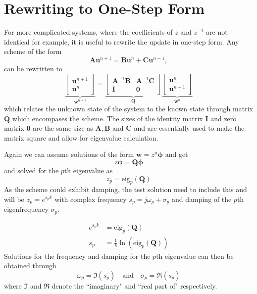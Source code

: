\documentclass{article}
\def\u{\mathbf{u}}
\def\w{\mathbf{w}}
\def\I{\mathbf{I}}
\def\A{\mathbf{A}}
\def\B{\mathbf{B}}
\def\C{\mathbf{C}}
\def\Q{\mathbf{Q}}
\begin{document}
\section{Rewriting to One-Step Form}
For more complicated systems, where the coefficients of $z$ and $z^{-1}$ are not identical for example, it is useful to rewrite the update in one-step form. Any scheme of the form
\begin{equation}
    \A\u^{n+1}=\B\u^n + \C\u^{n-1},
\end{equation}
can be rewritten to
\begin{equation}\label{eq:oneStepForm}
    \underbrace{\begin{bmatrix}
        \u^{n+1}\\
        \u^n
    \end{bmatrix}}_{\w^{n+1}} = 
    \underbrace{\begin{bmatrix}
        \A^{-1}\B & \A^{-1}\C\\
        \I & \mathbf{0}
    \end{bmatrix}}_{\Q}
    \underbrace{\begin{bmatrix}
        \u^n\\
        \u^{n-1}
    \end{bmatrix}}_{\w^n}
\end{equation}
which relates the unknown state of the system to the known state through matrix $\Q$ which encompases the scheme. The sizes of the identity matrix $\I$ and zero matrix $\mathbf{0}$ are the same size as $\A, \B$ and $\C$ and are essentially used to make the matrix square and allow for eigenvalue calculation.

Again we can assume solutions of the form $\w = z^n\boldsymbol{\phi}$ and get
\begin{equation}
    z\boldsymbol{\phi} = \Q\boldsymbol{\phi} 
\end{equation}
and solved for the $p$th eigenvalue as
\begin{equation}
    z_p = \text{eig}_p(\Q)
\end{equation}
As the scheme could exhibit damping, the test solution need to include this and will be $z_p = e^{s_pk}$ with complex frequency $s_p= j\omega_p + \sigma_p$ and damping of the $p$th eigenfrequency $\sigma_p$.

\begin{align}
    e^{s_pk} &= \text{eig}_p(\Q)\nonumber\\
    s_p &= \frac{1}{k}\ln \left(\text{eig}_p(\Q)\right)\label{eq:sp}
\end{align}
Solutions for the frequency and damping for the $p$th eigenvalue can then be obtained through
\begin{equation}
    \omega_p = \mathfrak{I}(s_p) \quad \text{and} \quad \sigma_p = \mathfrak{R}(s_p)
\end{equation}
where $\mathfrak{I}$ and $\mathfrak{R}$ denote the ``imaginary" and ``real part of" respectively. 
\end{document}
